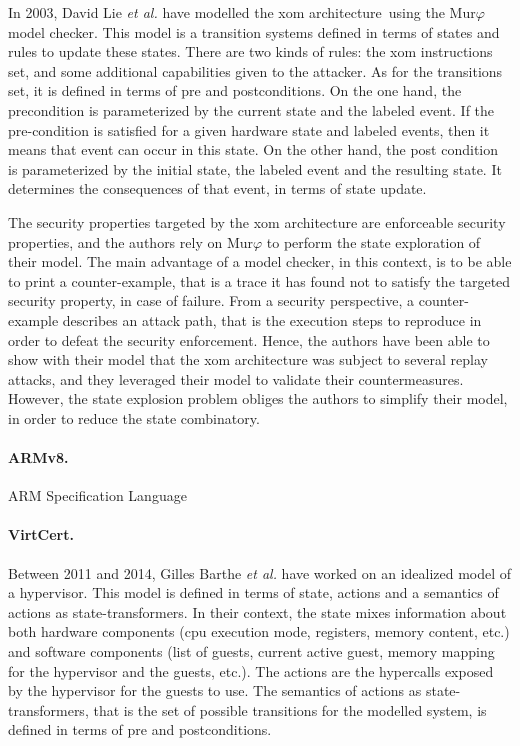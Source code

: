 In 2003, David Lie \emph{et al.} have modelled the \ac{xom}
architecture\,\cite{lie2003xom} using the Mur$\varphi$ model
checker.
%
This model is a transition systems defined in terms of states and rules to
update these states.
%
There are two kinds of rules: the \ac{xom} instructions set, and some additional
capabilities given to the attacker.
%
As for the transitions set, it is defined in terms of pre and postconditions.
%
On the one hand, the precondition is parameterized by the current state and the
labeled event.
%
If the pre-condition is satisfied for a given hardware state and labeled events,
then it means that event can occur in this state.
%
On the other hand, the post condition is parameterized by the initial state, the
labeled event and the resulting state.
%
It determines the consequences of that event, in terms of state update.

The security properties targeted by the \ac{xom} architecture are enforceable
security properties, and the authors rely on Mur$\varphi$ to perform the state
exploration of their model.
%
The main advantage of a model checker, in this context, is to be able to print a
counter-example, that is a trace it has found not to satisfy the targeted
security property, in case of failure.
%
From a security perspective, a counter-example describes an attack path, that is
the execution steps to reproduce in order to defeat the security enforcement.
%
Hence, the authors have been able to show with their model that the \ac{xom}
architecture was subject to several replay attacks, and they leveraged their
model to validate their countermeasures.
%
However, the state explosion problem obliges the authors to simplify their
model, in order to reduce the state combinatory.

\paragraph{ARMv8.}
%
ARM Specification Language

\paragraph{VirtCert.}
%
Between 2011 and 2014, Gilles Barthe \emph{et al.} have worked on an idealized
model of a hypervisor.
%
This model is defined in terms of state, actions and a semantics of actions as
state-trans\-formers.
%
In their context, the state mixes information about both hardware components
(\ac{cpu} execution mode, registers, memory content, etc.) and software
components (list of guests, current active guest, memory mapping for the
hypervisor and the guests, etc.).
%
The actions are the hypercalls exposed by the hypervisor for the guests to use.
%
The semantics of actions as state-transformers, that is the set of possible
transitions for the modelled system, is defined in terms of pre and
postconditions.


